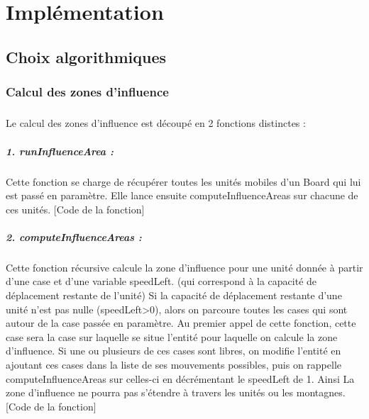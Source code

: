 \chapter{Implémentation}
	
	\section{Choix algorithmiques}

		\subsection{Calcul des zones d'influence}
		
			\paragraph{}
			Le calcul des zones d'influence est découpé en 2 fonctions distinctes :
			
			\paragraph{1. runInfluenceArea : }
			Cette fonction se charge de récupérer toutes les unités mobiles d'un Board qui lui est passé en paramètre.
			Elle lance ensuite computeInfluenceAreas sur chacune de ces unités.
			[Code de la fonction]
			
			\paragraph{2. computeInfluenceAreas : }
			Cette fonction récursive calcule la zone d'influence pour une unité donnée à partir d'une case et d'une variable speedLeft. 
			(qui correspond à la capacité de déplacement restante de l'unité)
			Si la capacité de déplacement restante d'une unité n'est pas nulle (speedLeft\textgreater0), alors on parcoure toutes les cases 
			qui sont autour de la case passée en paramètre. 
			Au premier appel de cette fonction, cette case sera la case sur laquelle se situe l'entité pour laquelle on calcule la zone d'influence.
			Si une ou plusieurs de ces cases sont libres, on modifie l'entité en ajoutant ces cases dans la liste de ses mouvements possibles, 
			puis on rappelle computeInfluenceAreas sur celles-ci en décrémentant le speedLeft de 1.
			Ainsi La zone d'influence ne pourra pas s'étendre à travers les unités ou les montagnes.
			[Code de la fonction]
		
